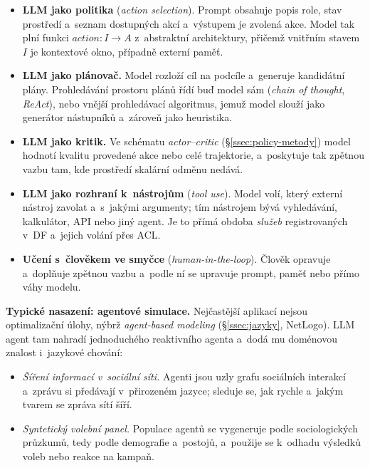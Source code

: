 \documentclass[11pt,a4paper]{article}
\theoremstyle{definition}
\begin{document}
\begin{defbox}
\begin{itemize}
\item \textbf{LLM jako politika} (\emph{action selection}). Prompt obsahuje popis role, stav
  prostředí a~seznam dostupných akcí a~výstupem je zvolená akce. Model tak plní funkci
  $\mathit{action} : I \to A$ z~abstraktní architektury, přičemž vnitřním stavem $I$ je
  kontextové okno, případně externí paměť.
\item \textbf{LLM jako plánovač.} Model rozloží cíl na podcíle a~generuje kandidátní plány.
  Prohledávání prostoru plánů řídí buď model sám (\emph{chain of thought}, \emph{ReAct}), nebo
  vnější prohledávací algoritmus, jemuž model slouží jako generátor nástupníků a~zároveň jako
  heuristika.
\item \textbf{LLM jako kritik.} Ve schématu \emph{actor--critic} (\S\ref{ssec:policy-metody})
  model hodnotí kvalitu provedené akce nebo celé trajektorie, a~poskytuje tak zpětnou vazbu
  tam, kde prostředí skalární odměnu nedává.
\item \textbf{LLM jako rozhraní k~nástrojům} (\emph{tool use}). Model volí, který externí
  nástroj zavolat a~s~jakými argumenty; tím nástrojem bývá vyhledávání, kalkulátor, API nebo
  jiný agent. Je to přímá obdoba \emph{služeb} registrovaných v~DF a~jejich volání přes ACL.
\item \textbf{Učení s~člověkem ve smyčce} (\emph{human-in-the-loop}). Člověk opravuje
  a~doplňuje zpětnou vazbu a~podle ní se upravuje prompt, paměť nebo přímo váhy modelu.
\end{itemize}
\end{defbox}

\textbf{Typické nasazení: agentové simulace.} Nejčastější aplikací nejsou optimalizační úlohy,
nýbrž \emph{agent-based modeling} (\S\ref{ssec:jazyky}, NetLogo). LLM agent tam nahradí
jednoduchého reaktivního agenta a~dodá mu doménovou znalost i~jazykové chování:
\begin{itemize}
\item \emph{Šíření informací v~sociální síti.} Agenti jsou uzly grafu sociálních interakcí
  a~zprávu si předávají v~přirozeném jazyce; sleduje se, jak rychle a~jakým tvarem se zpráva
  sítí šíří.
\item \emph{Syntetický volební panel.} Populace agentů se vygeneruje podle sociologických
  průzkumů, tedy podle demografie a~postojů, a~použije se k~odhadu výsledků voleb nebo reakce
  na kampaň.
\end{itemize}
\end{document}
